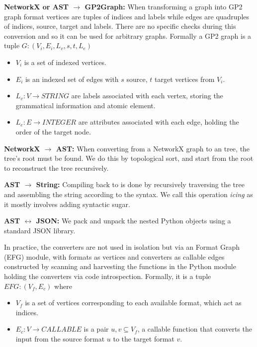 \noindent \textbf{NetworkX or \essence AST $\rightarrow$  GP2Graph:} When transforming a graph into GP2 graph format vertices are tuples of indices and labels while edges are quadruples of indices, source, target and labels. There are no \essence specific checks during this conversion and so it can be used for arbitrary graphs. Formally a GP2 graph is a tuple $G: (V_i,E_i,L_v,s,t,L_e)$
\begin{itemize}
    \item $V_i$ is a set of indexed vertices.
    \item $E_i$ is an indexed set of edges with $s$ source, $t$ target vertices from $V_i$.
    \item $L_v : V \rightarrow STRING$ are labels associated with each vertex, storing the grammatical information and atomic element.
    \item $L_e : E \rightarrow INTEGER$ are attributes associated with each edge, holding the order of the target node.
\end{itemize}


\noindent\textbf{NetworkX $\rightarrow$ \essence AST:} When converting from a NetworkX graph to an \essence tree, the tree's root must be found. We do this by topological sort, and start from the root to reconstruct the tree recursively.

\noindent\textbf{\essence AST $\rightarrow$ \essence String:} Compiling back to \essence is done by recursively traversing the tree and assembling the string according to the \essence syntax. We call this operation \textit{icing} as it mostly involves adding syntactic sugar.

\noindent\textbf{\essence AST $\leftrightarrow$ JSON:} We pack and unpack the nested Python objects using a standard JSON library.


In practice, the converters are not used in isolation but via an \essence Format Graph (EFG) module, with formats as vertices and converters as callable edges constructed by scanning and harvesting the functions in the Python module holding the converters via code introspection. Formally, it is a tuple $EFG : (V_f, E_c)$ where
\begin{itemize}
    \item $V_f$ is a set of vertices corresponding to each available format, which act as indices.
    \item $E_c : V \rightarrow CALLABLE$ is a pair $u,v \subseteq V_f$, a callable function that converts the input from the source format $u$ to the target format $v$.
\end{itemize}


